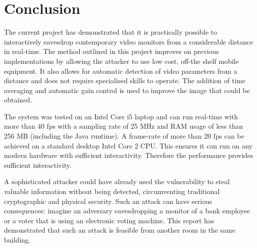 \documentclass[a4paper,12pt,twoside,openright]{report}
\begin{document}
\section{Conclusion}

The current project has demonstrated that it is practically possible to interactively eavesdrop contemporary video monitors from a considerable distance in real-time. The method outlined in this project improves on previous implementations by allowing the attacker to use low cost, off-the shelf mobile equipment. It also allows for automatic detection of video parameters from a distance and does not require specialised skills to operate. The addition of time averaging and automatic gain control is used to improve the image that could be obtained.

The system was tested on an Intel Core i5 laptop and can run real-time with more than 40 fps with a sampling rate of 25 MHz and RAM usage of less than 256 MB (including the Java runtime). A frame-rate of more than 20 fps can be achieved on a standard desktop Intel Core 2 CPU. This ensures it can run on any modern hardware with sufficient interactivity. Therefore the performance provides sufficient interactivity.

A sophisticated attacker could have already used the vulnerability to steal valuable information without being detected, circumventing traditional cryptographic and physical security. Such an attack can have serious consequences: imagine an adversary eavesdropping a monitor of a bank employee or a voter that is using an electronic voting machine. This report has demonstrated that such an attack is feasible from another room in the same building.

\appendix
\singlespacing

 
 
\end{document}
